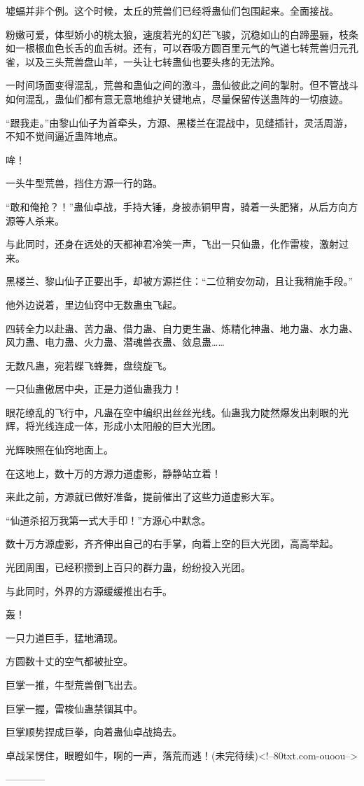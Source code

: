 \begin{this_body}
墟蝠并非个例。这个时候，太丘的荒兽们已经将蛊仙们包围起来。全面接战。

粉嫩可爱，体型娇小的桃太狼，速度若光的幻芒飞骏，沉稳如山的白蹄墨骊，枝条如一根根血色长舌的血舌树。还有，可以吞吸方圆百里元气的气道七转荒兽归元孔雀，以及三头荒兽盘山羊，一头让七转蛊仙也要头疼的无法羚。

一时间场面变得混乱，荒兽和蛊仙之间的激斗，蛊仙彼此之间的掣肘。但不管战斗如何混乱，蛊仙们都有意无意地维护关键地点，尽量保留传送蛊阵的一切痕迹。

“跟我走。”由黎山仙子为首牵头，方源、黑楼兰在混战中，见缝插针，灵活周游，不知不觉间逼近蛊阵地点。

哞！

一头牛型荒兽，挡住方源一行的路。

“敢和俺抢？！”蛊仙卓战，手持大锤，身披赤铜甲胄，骑着一头肥猪，从后方向方源等人杀来。

与此同时，还身在远处的天都神君冷笑一声，飞出一只仙蛊，化作雷梭，激射过来。

黑楼兰、黎山仙子正要出手，却被方源拦住：“二位稍安勿动，且让我稍施手段。”

他外边说着，里边仙窍中无数蛊虫飞起。

四转全力以赴蛊、苦力蛊、借力蛊、自力更生蛊、炼精化神蛊、地力蛊、水力蛊、风力蛊、电力蛊、火力蛊、潜魂兽衣蛊、敛息蛊……

无数凡蛊，宛若蝶飞蜂舞，盘绕旋飞。

一只仙蛊傲居中央，正是力道仙蛊我力！

眼花缭乱的飞行中，凡蛊在空中编织出丝丝光线。仙蛊我力陡然爆发出刺眼的光辉，将光线连成一体，形成小太阳般的巨大光团。

光辉映照在仙窍地面上。

在这地上，数十万的方源力道虚影，静静站立着！

来此之前，方源就已做好准备，提前催出了这些力道虚影大军。

“仙道杀招万我第一式大手印！”方源心中默念。

数十万方源虚影，齐齐伸出自己的右手掌，向着上空的巨大光团，高高举起。

光团周围，已经积攒到上百只的群力蛊，纷纷投入光团。

与此同时，外界的方源缓缓推出右手。

轰！

一只力道巨手，猛地涌现。

方圆数十丈的空气都被扯空。

巨掌一推，牛型荒兽倒飞出去。

巨掌一握，雷梭仙蛊禁锢其中。

巨掌顺势捏成巨拳，向着蛊仙卓战捣去。

卓战呆愣住，眼瞪如牛，啊的一声，落荒而逃！(未完待续)<!--80txt.com-ouoou-->

------------

\end{this_body}

